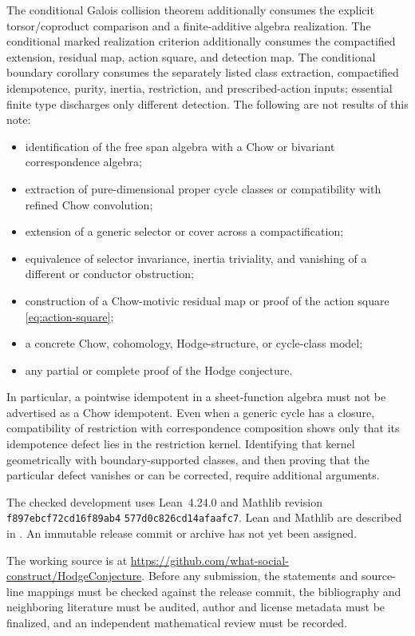 \documentclass[11pt]{article}
\theoremstyle{definition}
\theoremstyle{remark}
\begin{document}
The conditional Galois collision theorem additionally consumes the explicit
torsor/coproduct comparison and a finite-additive algebra realization.  The
conditional marked realization criterion additionally consumes the
compactified extension, residual map, action square, and detection map.  The
conditional boundary corollary consumes the separately listed class
extraction, compactified idempotence, purity, inertia, restriction, and
prescribed-action inputs; essential finite type discharges only different
detection.  The following are not results of this note:

\begin{itemize}[leftmargin=2.2em]
  \item identification of the free span algebra with a Chow or bivariant
        correspondence algebra;
  \item extraction of pure-dimensional proper cycle classes or compatibility
        with refined Chow convolution;
  \item extension of a generic selector or cover across a compactification;
  \item equivalence of selector invariance, inertia triviality, and vanishing
        of a different or conductor obstruction;
  \item construction of a Chow-motivic residual map or proof of the action
        square \eqref{eq:action-square};
  \item a concrete Chow, cohomology, Hodge-structure, or cycle-class model;
  \item any partial or complete proof of the Hodge conjecture.
\end{itemize}

In particular, a pointwise idempotent in a sheet-function algebra must not be
advertised as a Chow idempotent.  Even when a generic cycle has a closure,
compatibility of restriction with correspondence composition shows only that
its idempotence defect lies in the restriction kernel.  Identifying that
kernel geometrically with boundary-supported classes, and then proving that
the particular defect vanishes or can be corrected, require additional
arguments.

The checked development uses Lean~4.24.0 and Mathlib revision
\texttt{f897ebcf72cd16f89ab4}\allowbreak
\texttt{577d0c826cd14afaafc7}.  Lean and Mathlib are described in
\cite{Lean4,Mathlib}.  An immutable release commit or archive has not yet
been assigned.

The working source is at
\url{https://github.com/what-social-construct/HodgeConjecture}.  Before any
submission, the statements and source-line mappings must be checked against
the release commit, the bibliography and neighboring literature must be
audited, author and license metadata must be finalized, and an independent
mathematical review must be recorded.
\end{document}

